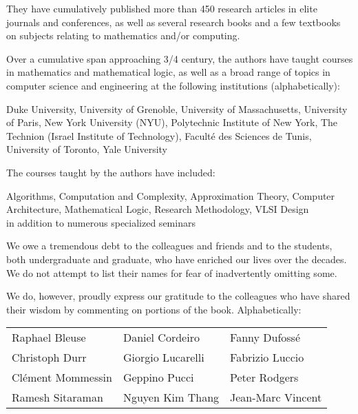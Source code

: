 \medskip

\noindent
They have cumulatively published more than 450 research articles in elite journals and conferences, as well as several research books and a few textbooks on subjects relating to
mathematics and/or computing.

\bigskip

Over a cumulative span approaching 3/4 century, the authors have taught courses in mathematics and mathematical logic, as well as a broad range of topics in computer science and engineering at the following institutions (alphabetically):

\smallskip

\noindent
Duke University, 
University of Grenoble,
University of Massachusetts,
University of Paris,
New York University (NYU),
Polytechnic Institute of New York,
The Technion (Israel Institute of Technology),
Facult\'e des Sciences de Tunis,
University of Toronto,
Yale University

\medskip

\noindent
The courses taught by the authors have included:

\smallskip

\noindent
Algorithms,
Computation and Complexity, Approximation Theory,
Computer Architecture,
Mathematical Logic,
Research Methodology,
VLSI Design \\
in addition to numerous specialized seminars

\vspace*{.25in}

\noindent
We owe a tremendous debt to the colleagues and friends and to the students, both undergraduate and graduate, who have enriched our lives over the decades.  We do not attempt to list their names for fear of inadvertently omitting some.

\noindent
We do, however, proudly express our gratitude to the colleagues who have shared their wisdom by commenting on portions of the book.  Alphabetically:

\begin{center}
\begin{tabular}{lll}
Raphael Bleuse & \hspace*{.35in}
Daniel Cordeiro & \hspace*{.35in}
Fanny Dufoss\'{e}  \\
Christoph Durr & \hspace*{.35in}
Giorgio Lucarelli & \hspace*{.35in}
Fabrizio Luccio \\
Cl\'{e}ment Mommessin & \hspace*{.35in}
Geppino Pucci & \hspace*{.35in}
Peter Rodgers \\
Ramesh Sitaraman & \hspace*{.35in}
Nguyen Kim Thang & \hspace*{.35in}
Jean-Marc Vincent
\end{tabular}
\end{center}

